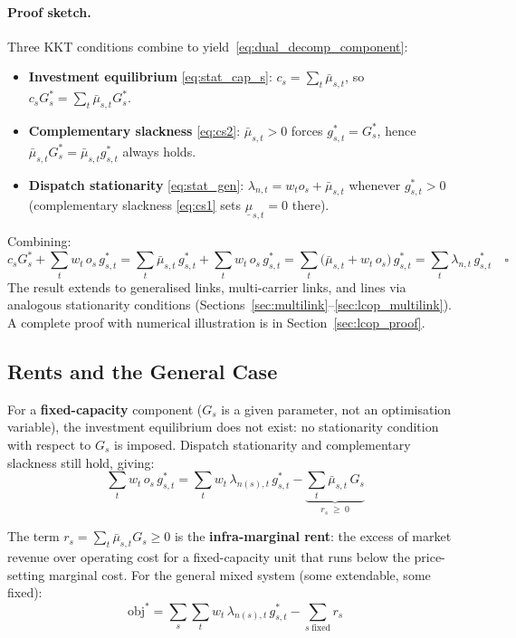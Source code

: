 \documentclass{article}
\begin{document}
\paragraph{Proof sketch.}
Three KKT conditions combine to yield~\eqref{eq:dual_decomp_component}:
\begin{itemize}
    \item \textbf{Investment equilibrium} \eqref{eq:stat_cap_s}:
          $c_s = \sum_t \bar{\mu}_{s,t}$, so
          $c_s G_s^* = \sum_t \bar{\mu}_{s,t} G_s^*$.
    \item \textbf{Complementary slackness} \eqref{eq:cs2}: $\bar{\mu}_{s,t} > 0$
          forces $g_{s,t}^* = G_s^*$, hence
          $\bar{\mu}_{s,t} G_s^* = \bar{\mu}_{s,t} g_{s,t}^*$ always holds.
    \item \textbf{Dispatch stationarity} \eqref{eq:stat_gen}:
          $\lambda_{n,t} = w_t o_s + \bar{\mu}_{s,t}$ whenever $g_{s,t}^* > 0$
          (complementary slackness \eqref{eq:cs1} sets
          $\underline{\mu}_{s,t} = 0$ there).
\end{itemize}
Combining:
\[
    c_s G_s^* + \sum_t w_t\, o_s\, g_{s,t}^*
    = \sum_t \bar{\mu}_{s,t}\, g_{s,t}^* + \sum_t w_t\, o_s\, g_{s,t}^*
    = \sum_t \bigl(\bar{\mu}_{s,t} + w_t\, o_s\bigr)\, g_{s,t}^*
    = \sum_t \lambda_{n,t}\, g_{s,t}^* \quad\square
\]
The result extends to generalised links, multi-carrier links, and lines via
analogous stationarity conditions (Sections~\ref{sec:multilink}--\ref{sec:lcop_multilink}).
A complete proof with numerical illustration is in Section~\ref{sec:lcop_proof}.

\subsection{Rents and the General Case}

For a \textbf{fixed-capacity} component ($G_s$ is a given parameter, not an
optimisation variable), the investment equilibrium does not exist: no
stationarity condition with respect to $G_s$ is imposed. Dispatch stationarity
and complementary slackness still hold, giving:
\begin{equation}
    \sum_t w_t\, o_s\, g_{s,t}^*
    = \sum_t w_t\, \lambda_{n(s),t}\, g_{s,t}^*
      - \underbrace{\sum_t \bar{\mu}_{s,t}\, G_s}_{\displaystyle r_s \;\geq\; 0}
    \label{eq:fixed_cap_decomp}
\end{equation}

The term $r_s = \sum_t \bar{\mu}_{s,t} G_s \geq 0$ is the
\textbf{infra-marginal rent}: the excess of market revenue over operating cost
for a fixed-capacity unit that runs below the price-setting marginal cost.
For the general mixed system (some extendable, some fixed):
\begin{equation}
    \text{obj}^*
    = \sum_s \sum_t w_t\, \lambda_{n(s),t}\, g_{s,t}^*
      - \sum_{s\;\text{fixed}} r_s
    \label{eq:general_decomp}
\end{equation}
\end{document}
